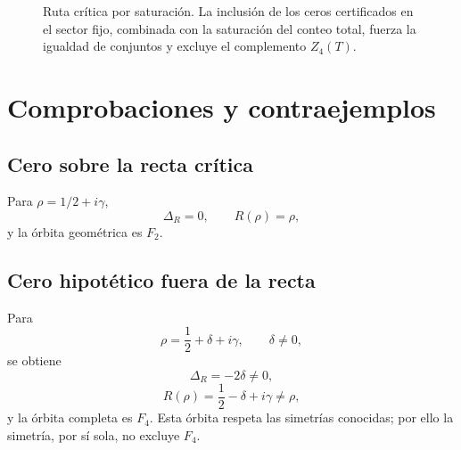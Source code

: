 \documentclass[11pt]{amsart}
\theoremstyle{definition}
\theoremstyle{remark}
\begin{document}
\begin{figure}[t]
\centering
{}
\caption{Ruta crítica por saturación. La inclusión de los ceros certificados en el sector fijo, combinada con la saturación del conteo total, fuerza la igualdad de conjuntos y excluye el complemento $Z_4(T)$.}
\label{fig:saturation-route}
\end{figure}

\section{Comprobaciones y contraejemplos}
\subsection{Cero sobre la recta crítica}
Para $\rho=1/2+i\gamma$,
\[
\Delta_R=0,\qquad R(\rho)=\rho,
\]
y la órbita geométrica es $F_2$.

\subsection{Cero hipotético fuera de la recta}
Para
\begin{equation}
 \rho=\frac12+\delta+i\gamma,\qquad\delta\neq0,
\end{equation}
se obtiene
\begin{equation}
 \Delta_R=-2\delta\neq0,
\end{equation}
\begin{equation}
 R(\rho)=\frac12-\delta+i\gamma\neq\rho,
\end{equation}
y la órbita completa es $F_4$. Esta órbita respeta las simetrías conocidas; por ello la simetría, por sí sola, no excluye $F_4$.
\end{document}

